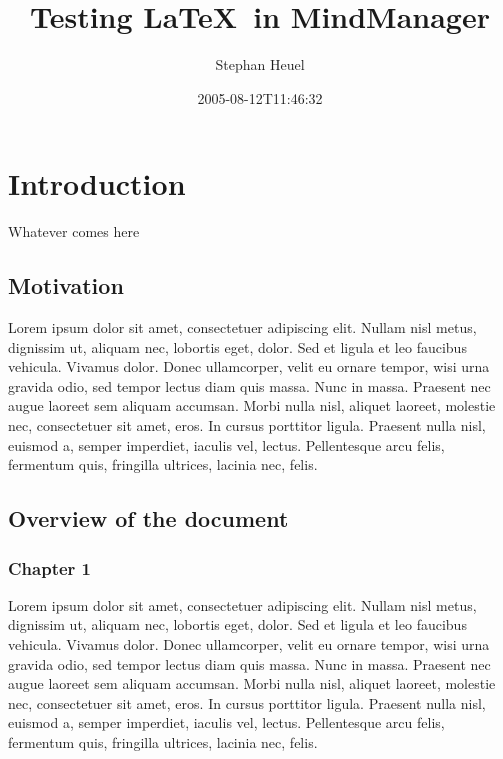\documentclass{article}
\title{Testing \LaTeX\  in MindManager}
\author{Stephan Heuel}
\date{2005-08-12T11:46:32}
\begin{document}
 
\maketitle
\tableofcontents
\newpage
    
\section{Introduction}
      


Whatever comes here

\subsection{Motivation}
      


Lorem ipsum dolor sit amet, consectetuer adipiscing elit. Nullam 
nisl metus, dignissim ut, aliquam nec, lobortis eget, dolor. Sed et 
ligula et leo faucibus vehicula. Vivamus dolor. Donec ullamcorper, 
velit eu ornare tempor, wisi urna gravida odio, sed tempor lectus 
diam quis massa. Nunc in massa. Praesent nec augue laoreet 
sem aliquam accumsan. Morbi nulla nisl, aliquet laoreet, molestie 
nec, consectetuer sit amet, eros. In cursus porttitor ligula. 
Praesent nulla nisl, euismod a, semper imperdiet, iaculis vel, 
lectus. Pellentesque arcu felis, fermentum quis, fringilla ultrices, 
lacinia nec, felis.

\subsection{Overview of the document}
      
\subsubsection{Chapter 1}
      


Lorem ipsum dolor sit amet, consectetuer adipiscing elit. Nullam 
nisl metus, dignissim ut, aliquam nec, lobortis eget, dolor. Sed et 
ligula et leo faucibus vehicula. Vivamus dolor. Donec ullamcorper, 
velit eu ornare tempor, wisi urna gravida odio, sed tempor lectus 
diam quis massa. Nunc in massa. Praesent nec augue laoreet 
sem aliquam accumsan. Morbi nulla nisl, aliquet laoreet, molestie 
nec, consectetuer sit amet, eros. In cursus porttitor ligula. 
Praesent nulla nisl, euismod a, semper imperdiet, iaculis vel, 
lectus. Pellentesque arcu felis, fermentum quis, fringilla ultrices, 
lacinia nec, felis.
\end{document}
